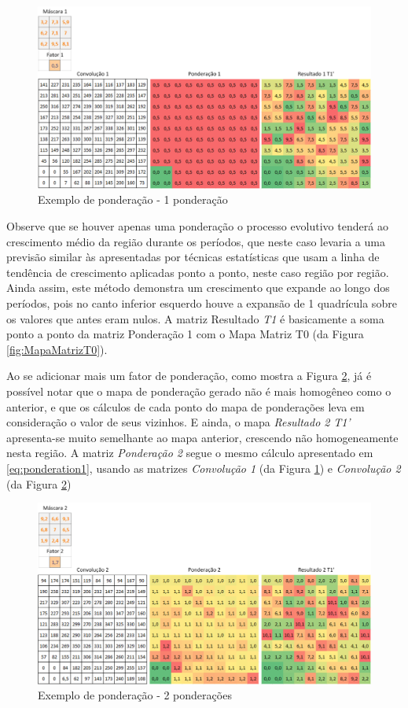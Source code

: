 \begin{figure}[h]
	\centering	\includegraphics[scale=0.6]{Figuras/PonderationsExample-1Ponderation.png}
	\caption{Exemplo de ponderação - 1 ponderação}
	\label{fig:OnePondertion}
\end{figure}

Observe que se houver apenas uma ponderação o processo evolutivo tenderá ao crescimento médio da região durante os períodos, que neste caso levaria a uma previsão similar às apresentadas por técnicas estatísticas que usam a linha de tendência de crescimento aplicadas ponto a ponto, neste caso região por região. Ainda assim, este método demonstra um crescimento que expande ao longo dos períodos, pois no canto inferior esquerdo houve a expansão de 1 quadrícula sobre os valores que antes eram nulos. A matriz Resultado \emph{T1} é basicamente a soma ponto a ponto da matriz Ponderação 1 com o Mapa Matriz T0 (da Figura \ref{fig:MapaMatrizT0}).

Ao se adicionar mais um fator de ponderação, como mostra a Figura \ref{fig:TwoPondertion}, já é possível notar que o mapa de ponderação gerado não é mais homogêneo como o anterior, e que os cálculos de cada ponto do mapa de ponderações leva em consideração o valor de seus vizinhos. E ainda, o mapa \emph{Resultado 2} \emph{T1’} apresenta-se muito semelhante ao mapa anterior, crescendo não homogeneamente nesta região. A matriz \emph{Ponderação 2} segue o mesmo cálculo apresentado em \ref{eq:ponderation1}, usando as matrizes \emph{Convolução 1} (da Figura \ref{fig:OnePondertion}) e \emph{Convolução 2} (da Figura \ref{fig:TwoPondertion})

\begin{figure}[h]
	\centering	\includegraphics[scale=0.6]{Figuras/PonderationsExample-2Ponderations.png}
	\caption{Exemplo de ponderação - 2 ponderações}
	\label{fig:TwoPondertion}
\end{figure}

